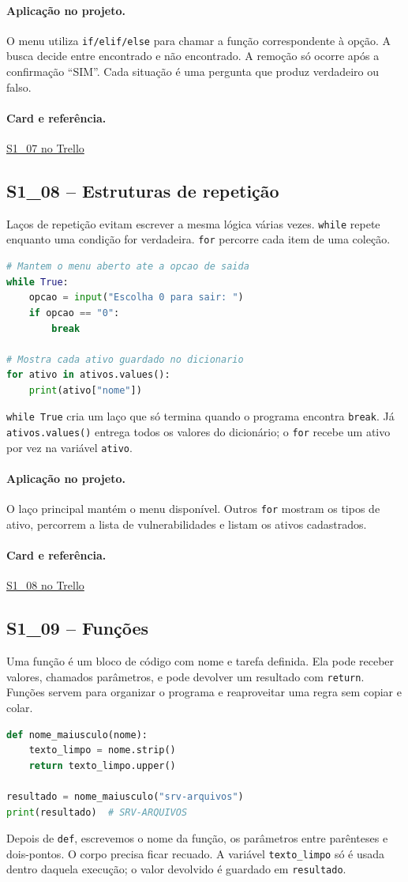 \documentclass[11pt,a4paper]{article}
\newcommand{\projeto}{\paragraph{Aplicação no projeto.}}
\newcommand{\referencia}[2]{\paragraph{Card e referência.}\href{#1}{#2}}
\newcommand{\cardsection}[1]{\Needspace{12\baselineskip}\subsection{#1}}
\begin{document}
\projeto
O menu utiliza \texttt{if/elif/else} para chamar a função correspondente à opção. A busca decide entre encontrado e não encontrado. A remoção só ocorre após a confirmação ``SIM''. Cada situação é uma pergunta que produz verdadeiro ou falso.

\referencia{https://trello.com/c/QvZa8m7a}{S1\_07 no Trello}

\cardsection{S1\_08 -- Estruturas de repetição}

Laços de repetição evitam escrever a mesma lógica várias vezes. \texttt{while} repete enquanto uma condição for verdadeira. \texttt{for} percorre cada item de uma coleção.

\begin{lstlisting}[language=Python,caption={while e for}]
# Mantem o menu aberto ate a opcao de saida
while True:
    opcao = input("Escolha 0 para sair: ")
    if opcao == "0":
        break

# Mostra cada ativo guardado no dicionario
for ativo in ativos.values():
    print(ativo["nome"])
\end{lstlisting}

\texttt{while True} cria um laço que só termina quando o programa encontra \texttt{break}. Já \texttt{ativos.values()} entrega todos os valores do dicionário; o \texttt{for} recebe um ativo por vez na variável \texttt{ativo}.

\projeto
O laço principal mantém o menu disponível. Outros \texttt{for} mostram os tipos de ativo, percorrem a lista de vulnerabilidades e listam os ativos cadastrados.

\referencia{https://trello.com/c/op3s5sKj}{S1\_08 no Trello}

\cardsection{S1\_09 -- Funções}

Uma função é um bloco de código com nome e tarefa definida. Ela pode receber valores, chamados parâmetros, e pode devolver um resultado com \texttt{return}. Funções servem para organizar o programa e reaproveitar uma regra sem copiar e colar.

\begin{lstlisting}[language=Python,caption={Função com parâmetro e retorno}]
def nome_maiusculo(nome):
    texto_limpo = nome.strip()
    return texto_limpo.upper()

resultado = nome_maiusculo("srv-arquivos")
print(resultado)  # SRV-ARQUIVOS
\end{lstlisting}

Depois de \texttt{def}, escrevemos o nome da função, os parâmetros entre parênteses e dois-pontos. O corpo precisa ficar recuado. A variável \texttt{texto\_limpo} só é usada dentro daquela execução; o valor devolvido é guardado em \texttt{resultado}.
\end{document}
